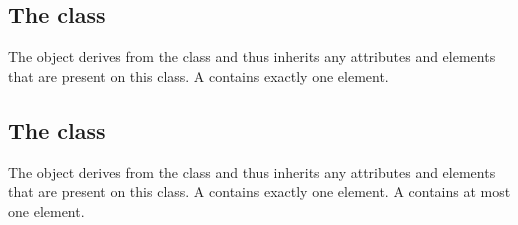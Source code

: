 \subsection{The  class}
\label{bowl-class}




The \Bowl object derives from the \SBase class and thus inherits any
attributes and elements that are present on this class.
A \Bowl contains exactly one \ListOfPears element.
\subsection{The  class}
\label{plate-class}




The \Plate object derives from the \SBase class and thus inherits any
attributes and elements that are present on this class.
A \Plate contains exactly one \ListOfApples element.
A \Plate contains at most one \ListOfBananas element.
